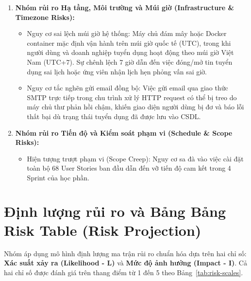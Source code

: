 \begin{enumerate}
\begin{itemize}
    \end{itemize}
    \item \textbf{Nhóm rủi ro Hạ tầng, Môi trường và Múi giờ (Infrastructure \& Timezone Risks):}
    \begin{itemize}
        \item Nguy cơ sai lệch múi giờ hệ thống: Máy chủ đám mây hoặc Docker container mặc định vận hành trên múi giờ quốc tế (UTC), trong khi người dùng và doanh nghiệp tuyển dụng hoạt động theo múi giờ Việt Nam (UTC+7). Sự chênh lệch 7 giờ dẫn đến việc đóng/mở tin tuyển dụng sai lịch hoặc ứng viên nhận lịch hẹn phỏng vấn sai giờ.
        \item Nguy cơ tắc nghẽn gửi email đồng bộ: Việc gửi email qua giao thức SMTP trực tiếp trong chu trình xử lý HTTP request có thể bị treo do máy chủ thư phản hồi chậm, khiến giao diện người dùng bị đơ và báo lỗi thất bại dù trạng thái tuyển dụng đã được lưu vào CSDL.
    \end{itemize}
    \item \textbf{Nhóm rủi ro Tiến độ và Kiểm soát phạm vi (Schedule \& Scope Risks):}
    \begin{itemize}
        \item Hiện tượng trượt phạm vi (Scope Creep): Nguy cơ sa đà vào việc cài đặt toàn bộ 68 User Stories ban đầu dẫn đến vỡ tiến độ cam kết trong 4 Sprint của học phần.
    \end{itemize}
\end{enumerate}

\section{Định lượng rủi ro và Bảng Bảng Risk Table (Risk Projection)}
\label{sec:bang-rui-ro}

Nhóm áp dụng mô hình định lượng ma trận rủi ro chuẩn hóa dựa trên hai chỉ số: \textbf{Xác suất xảy ra (Likelihood - L)} và \textbf{Mức độ ảnh hưởng (Impact - I)}. Cả hai chỉ số được đánh giá trên thang điểm từ 1 đến 5 theo Bảng~\ref{tab:risk-scales}.

